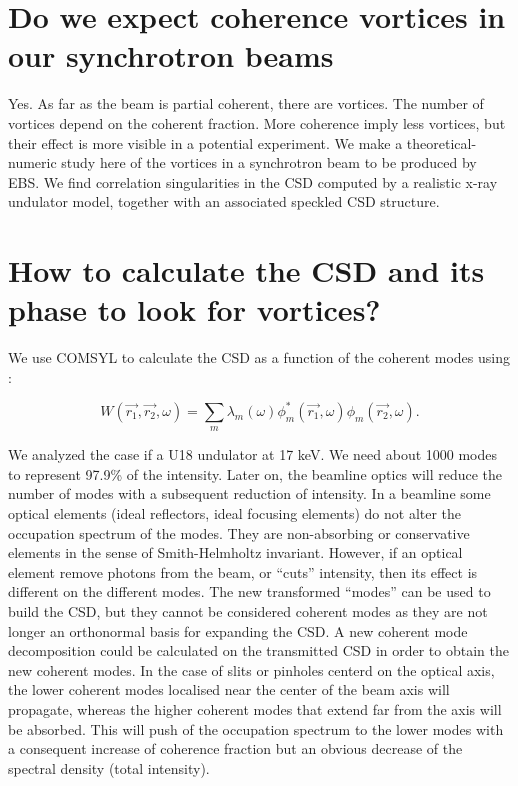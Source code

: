 \documentclass[a4paper,10pt]{article}
\begin{document}
 
\section{Do we expect coherence vortices in our synchrotron beams}

Yes. As far as the beam is partial coherent, there are vortices. The number of vortices depend on the coherent fraction. More coherence imply less vortices, but their effect is more visible in a potential experiment. We make a theoretical-numeric study here of the vortices in a synchrotron beam to be produced by EBS. We find correlation singularities in the CSD computed by a realistic x-ray undulator model, together with an associated speckled CSD structure.


\section{How to calculate the CSD and its phase to look for vortices?}

We use COMSYL to calculate the CSD as a function of the coherent modes using :


\begin{equation}
W(\vec{r_1}, \vec{r_2}, \omega)
=
\sum_m
\lambda_m(\omega)
\phi_m^*(\vec{r_1},\omega)
\phi_m(\vec{r_2}, \omega).
\end{equation}

We analyzed the case if a U18 undulator at 17 keV. We need about 1000 modes to represent 97.9\% of the intensity. Later on, the beamline optics will reduce the number of modes  with a subsequent reduction of intensity. In a beamline some optical elements (ideal reflectors, ideal focusing elements) do not alter the occupation spectrum of the modes. They are non-absorbing or conservative elements in the sense of Smith-Helmholtz invariant. However, if an optical element remove photons from the beam, or ``cuts'' intensity, then its effect is different on the different modes. The new transformed ``modes'' can be used to build the CSD, but they cannot be considered coherent modes as they are not longer an orthonormal basis for expanding the CSD. A new coherent mode decomposition could be calculated on the transmitted CSD in order to obtain the new coherent modes. In the case of slits or pinholes centerd on the optical axis, the lower coherent modes localised near the center of the beam axis will propagate, whereas the higher coherent modes that extend far from the axis will be absorbed. This will push of the occupation spectrum to the lower modes with a consequent increase of coherence fraction but an obvious decrease of the spectral density (total intensity).     
\end{document}
